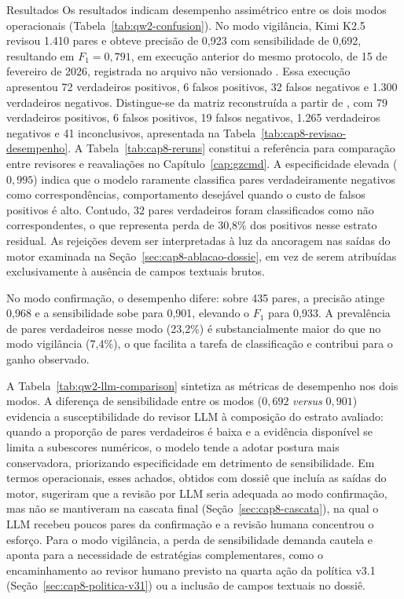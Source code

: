 \begin{chapter}{Resultados}
Os resultados indicam desempenho assimétrico entre os dois modos operacionais (Tabela~\ref{tab:qw2-confusion}).
No modo vigilância, Kimi K2.5 revisou 1.410 pares e obteve precisão de 0{,}923 com sensibilidade de 0{,}692, resultando em $F_1 = 0{,}791$, em execução anterior do mesmo protocolo, de 15 de fevereiro de 2026, registrada no arquivo não versionado . Essa execução apresentou 72 verdadeiros positivos, 6 falsos positivos, 32 falsos negativos e 1.300 verdadeiros negativos. Distingue-se da matriz reconstruída a partir de , com 79 verdadeiros positivos, 6 falsos positivos, 19 falsos negativos, 1.265 verdadeiros negativos e 41 inconclusivos, apresentada na Tabela~\ref{tab:cap8-revisao-desempenho}. A Tabela~\ref{tab:cap8-reruns} constitui a referência para comparação entre revisores e reavaliações no Capítulo~\ref{cap:gzcmd}.
A especificidade elevada ($0{,}995$) indica que o modelo raramente classifica pares verdadeiramente negativos como correspondências, comportamento desejável quando o custo de falsos positivos é alto.
Contudo, 32 pares verdadeiros foram classificados como não correspondentes, o que representa perda de 30{,}8\% dos positivos nesse estrato residual.
As rejeições devem ser interpretadas à luz da ancoragem nas saídas do motor examinada na Seção~\ref{sec:cap8-ablacao-dossie}, em vez de serem atribuídas exclusivamente à ausência de campos textuais brutos.

No modo confirmação, o desempenho difere: sobre 435 pares, a precisão atinge 0{,}968 e a sensibilidade sobe para 0{,}901, elevando o $F_1$ para 0{,}933.
A prevalência de pares verdadeiros nesse modo (23{,}2\%) é substancialmente maior do que no modo vigilância (7{,}4\%), o que facilita a tarefa de classificação e contribui para o ganho observado.



A Tabela~\ref{tab:qw2-llm-comparison} sintetiza as métricas de desempenho nos dois modos.
A diferença de sensibilidade entre os modos ($0{,}692$ \textit{versus} $0{,}901$) evidencia a susceptibilidade do revisor LLM à composição do estrato avaliado: quando a proporção de pares verdadeiros é baixa e a evidência disponível se limita a subescores numéricos, o modelo tende a adotar postura mais conservadora, priorizando especificidade em detrimento de sensibilidade.
Em termos operacionais, esses achados, obtidos com dossiê que incluía as saídas do motor, sugeriram que a revisão por LLM seria adequada ao modo confirmação, mas não se mantiveram na cascata final (Seção~\ref{sec:cap8-cascata}), na qual o LLM recebeu poucos pares da confirmação e a revisão humana concentrou o esforço.
Para o modo vigilância, a perda de sensibilidade demanda cautela e aponta para a necessidade de estratégias complementares, como o encaminhamento ao revisor humano previsto na quarta ação da política v3.1 (Seção~\ref{sec:cap8-politica-v31}) ou a inclusão de campos textuais no dossiê.


\end{chapter}
